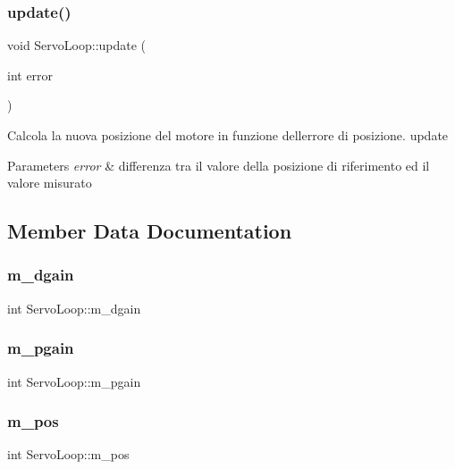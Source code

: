 \subsubsection{\texorpdfstring{update()}{update()}}
{\footnotesize\ttfamily void Servo\+Loop\+::update (\begin{DoxyParamCaption}\item[{int}]{error }\end{DoxyParamCaption})}

Calcola la nuova posizione del motore in funzione dell\textquotesingle{}errore di posizione.  update 
\begin{DoxyParams}{Parameters}
{\em error} & differenza tra il valore della posizione di riferimento ed il valore misurato \\
\hline
\end{DoxyParams}


\subsection{Member Data Documentation}
\mbox{\label{class_servo_loop_a6268eda0c0cf2f24700c29e24318f319}} 
\subsubsection{\texorpdfstring{m\+\_\+dgain}{m\_dgain}}
{\footnotesize\ttfamily int Servo\+Loop\+::m\+\_\+dgain}

\mbox{\label{class_servo_loop_a71e1790cb21e702d4b9be75085c684aa}} 
\subsubsection{\texorpdfstring{m\+\_\+pgain}{m\_pgain}}
{\footnotesize\ttfamily int Servo\+Loop\+::m\+\_\+pgain}

\mbox{\label{class_servo_loop_ad740330c60ab6aa9b089414578862845}} 
\subsubsection{\texorpdfstring{m\+\_\+pos}{m\_pos}}
{\footnotesize\ttfamily int Servo\+Loop\+::m\+\_\+pos}

